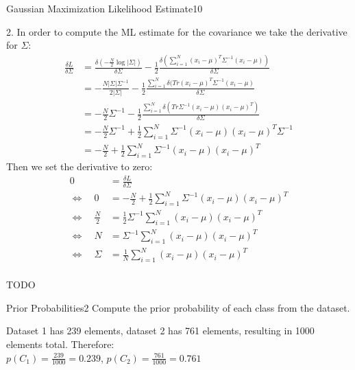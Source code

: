 \begin{questions}
\begin{question}{Gaussian Maximization Likelihood Estimate}{10}
\begin{answer}
2. In order to compute the ML estimate for the covariance we take the derivative for $\Sigma$:
\begin{align*}
\frac{\delta L}{\delta \Sigma} &= \frac{\delta (-\frac{N}{2} \log |\Sigma |)}{\delta \Sigma} - \frac{1}{2} \frac{\delta (\sum_{i=1}^{N}(x_i-\mu )^T \Sigma^{-1}(x_i-\mu ))}{\delta \Sigma}\\
&= -\frac{N|\Sigma |\Sigma^{-1}}{2|\Sigma |}-\frac{1}{2} \frac{\sum_{i=1}^{N} \delta (Tr(x_i-\mu )^T \Sigma^{-1}(x_i-\mu )}{\delta \Sigma} \\
&= -\frac{N}{2} \Sigma^{-1} - \frac{1}{2} \frac{\sum_{i=1}^{N} \delta ( Tr\Sigma^{-1}(x_i-\mu )(x_i-\mu )^T)}{\delta \Sigma} \\
&= -\frac{N}{2} \Sigma^{-1} + \frac{1}{2} \sum_{i=1}^{N} \Sigma^{-1} (x_i-\mu )(x_i-\mu )^T \Sigma^{-1} \\
&= -\frac{N}{2} + \frac{1}{2} \sum_{i=1}^{N} \Sigma^{-1} (x_i-\mu )(x_i-\mu )^T
\end{align*}
Then we set the derivative to zero:
\begin{align*}
0 &= \frac{\delta L}{\delta \Sigma} \\
\Leftrightarrow \quad 0 &= -\frac{N}{2} + \frac{1}{2} \sum_{i=1}^{N} \Sigma^{-1} (x_i-\mu )(x_i-\mu )^T \\
\Leftrightarrow \quad \frac{N}{2} &= \frac{1}{2} \Sigma^{-1} \sum_{i=1}^{N} (x_i-\mu )(x_i-\mu )^T \\
\Leftrightarrow \quad N &= \Sigma^{-1} \sum_{i=1}^{N} (x_i-\mu )(x_i-\mu )^T \\
\Leftrightarrow \quad \Sigma &= \frac{1}{N} \sum_{i=1}^{N} (x_i-\mu )(x_i-\mu )^T \\
\end{align*}

\end{answer}
{\LARGE TODO}
\end{question}



\begin{question}{Prior Probabilities}{2}
Compute the prior probability of each class from the dataset. 

\begin{answer}
Dataset 1 has 239 elements, dataset 2 has 761 elements, resulting in 1000 elements total. Therefore:\\
$p(C_1) = \frac{239}{1000}=0.239$, $p(C_2) = \frac{761}{1000}=0.761$
\end{answer}


\end{question}
\end{questions}
